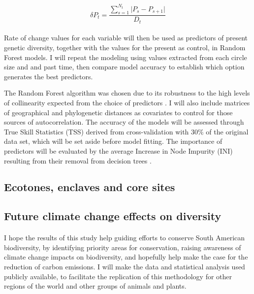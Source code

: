 \documentclass{article}
\begin{document}
{\begin{equation}
\label{eqn:Eq1}
\delta P_{t} = \frac{\sum\limits_{s=1}^{N_{t}} \lvert P_{s} - P_{s+1} \rvert}{D_{t}}	
\end{equation}

\paragraph{} Rate of change values for each variable will then be used as predictors of present genetic diversity, together with the values for the present as control, in Random Forest models. I will repeat the modeling using values extracted from each circle size and and past time, then compare model accuracy to establish which option generates the best predictors. %
\begin{comment}
I think this approach can give us info on spatial variability while avoiding all the uncertainty of estimating distributions, which would be especially hard to do for individual populations.
\end{comment} 
The Random Forest algorithm was chosen due to its robustness to the high levels of collinearity expected from the choice of predictors \cite{james2013introduction}. I will also include matrices of geographical and phylogenetic distances as covariates to control for those sources of autocorrelation. The accuracy of the models will be assessed through True Skill Statistics (TSS) derived from cross-validation with 30\% of the original data set, which will be set aside before model fitting. The importance of predictors will be evaluated by the average Increase in Node Impurity (INI) resulting from their removal from decision trees \cite{james2013introduction}.



\subsection{Ecotones, enclaves and core sites}

\subsection{Future climate change effects on diversity}


\paragraph{} I hope the results of this study help guiding efforts to conserve South American biodiversity, by identifying priority areas for conservation, raising awareness of climate change impacts on biodiversity, and hopefully help make the case for the reduction of carbon emissions. I will make the data and statistical analysis used publicly available, to facilitate the replication of this methodology for other regions of the world and other groups of animals and plants.

}
\end{document}
